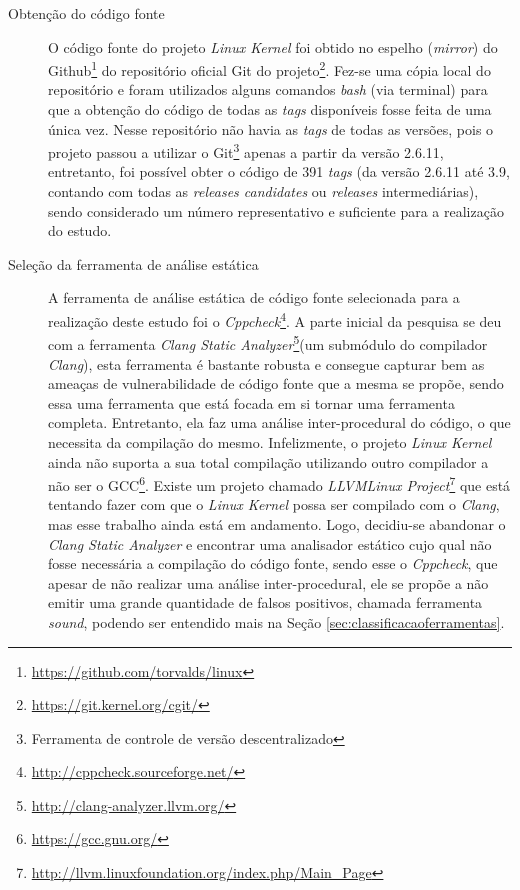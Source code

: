 \begin{description}

\item[Obtenção do código fonte]

O código fonte do projeto \textit{Linux Kernel} foi obtido no espelho
(\textit{mirror}) do Github\footnote{\url{https://github.com/torvalds/linux}}
do repositório oficial Git do
projeto\footnote{\url{https://git.kernel.org/cgit/}}.  Fez-se uma cópia local
do repositório e foram utilizados alguns comandos \textit{bash} (via terminal)
para que a obtenção do código de todas as \textit{tags} disponíveis fosse feita
de uma única vez. Nesse repositório não havia as \textit{tags} de todas as
versões, pois o projeto passou a utilizar o Git\footnote{Ferramenta de controle
de versão descentralizado} apenas a partir da versão 2.6.11, entretanto, foi
possível obter o código de 391 \textit{tags} (da versão 2.6.11 até 3.9, contando
com todas as \textit{releases candidates} ou \textit{releases} intermediárias),
sendo considerado um número representativo e suficiente para a realização do
estudo.

\item[Seleção da ferramenta de análise estática]

A ferramenta de análise estática de código fonte selecionada para a realização
deste estudo foi o
\textit{Cppcheck}\footnote{\url{http://cppcheck.sourceforge.net/}}.  A parte
inicial da pesquisa se deu com a ferramenta \textit{Clang Static
Analyzer}\footnote{\url{http://clang-analyzer.llvm.org/}}(um submódulo do
compilador \textit{Clang}), esta ferramenta é bastante robusta e consegue capturar
bem as ameaças de vulnerabilidade de código fonte que a mesma se propõe, sendo
essa uma ferramenta que está focada em si tornar uma ferramenta completa.
Entretanto, ela faz uma análise inter-procedural do código, o que necessita da
compilação do mesmo.  Infelizmente, o projeto \textit{Linux Kernel} ainda não
suporta a sua total compilação utilizando outro compilador a não ser o
GCC\footnote{\url{https://gcc.gnu.org/}}. Existe um projeto chamado
\textit{LLVMLinux
Project}\footnote{\url{http://llvm.linuxfoundation.org/index.php/Main_Page}} que
está tentando fazer com que o \textit{Linux Kernel} possa ser compilado com o
\textit{Clang}, mas esse trabalho ainda está em andamento. Logo, decidiu-se
abandonar o \textit{Clang Static Analyzer} e encontrar uma analisador estático
cujo qual não fosse necessária a compilação do código fonte, sendo esse o
\textit{Cppcheck}, que apesar de não realizar uma análise inter-procedural, ele
se propõe a não emitir uma grande quantidade de falsos positivos, chamada
ferramenta \textit{sound}, podendo ser entendido mais na Seção
\ref{sec:classificacaoferramentas}.


\end{description}

